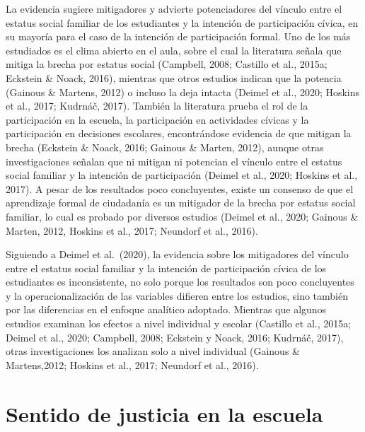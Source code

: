 \documentclass[12pt,twoside]{templates/facsothesis}
\begin{document}
La evidencia sugiere mitigadores y advierte potenciadores del vínculo entre el estatus social familiar de los estudiantes y la intención de participación cívica, en su mayoría para el caso de la intención de participación formal. Uno de los más estudiados es el clima abierto en el aula, sobre el cual la literatura señala que mitiga la brecha por estatus social (Campbell, 2008; Castillo et al., 2015a; Eckstein \& Noack, 2016), mientras que otros estudios indican que la potencia (Gainous \& Martens, 2012) o incluso la deja intacta (Deimel et al., 2020; Hoskins et al., 2017; Kudrnáč, 2017). También la literatura prueba el rol de la participación en la escuela, la participación en actividades cívicas y la participación en decisiones escolares, encontrándose evidencia de que mitigan la brecha (Eckstein \& Noack, 2016; Gainous \& Marten, 2012), aunque otras investigaciones señalan que ni mitigan ni potencian el vínculo entre el estatus social familiar y la intención de participación (Deimel et al., 2020; Hoskins et al., 2017). A pesar de los resultados poco concluyentes, existe un consenso de que el aprendizaje formal de ciudadanía es un mitigador de la brecha por estatus social familiar, lo cual es probado por diversos estudios (Deimel et al., 2020; Gainous \& Marten, 2012, Hoskins et al., 2017; Neundorf et al., 2016).

Siguiendo a Deimel et al.~(2020), la evidencia sobre los mitigadores del vínculo entre el estatus social familiar y la intención de participación cívica de los estudiantes es inconsistente, no solo porque los resultados son poco concluyentes y la operacionalización de las variables difieren entre los estudios, sino también por las diferencias en el enfoque analítico adoptado. Mientras que algunos estudios examinan los efectos a nivel individual y escolar (Castillo et al., 2015a; Deimel et al., 2020; Campbell, 2008; Eckstein y Noack, 2016; Kudrnáč, 2017), otras investigaciones los analizan solo a nivel individual (Gainous \& Martens,2012; Hoskins et al., 2017; Neundorf et al., 2016).

\hypertarget{sentido-de-justicia-en-la-escuela}{%
\chapter{Sentido de justicia en la escuela}\label{sentido-de-justicia-en-la-escuela}}
\end{document}

